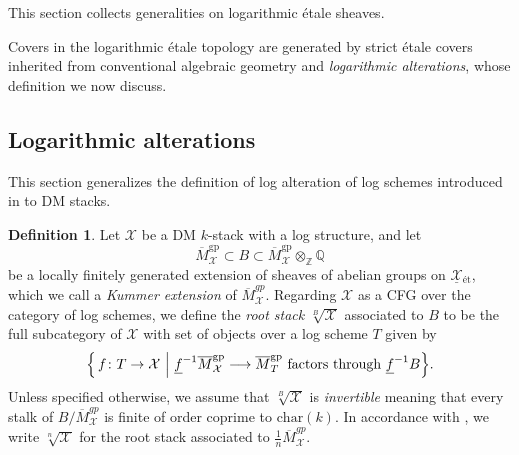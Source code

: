 \documentclass[11pt]{amsart}
\theoremstyle{definition}
\theoremstyle{definition}
\newtheorem{lemma}[theorem]{Lemma}
\newtheorem{definition}[theorem]{Definition}
\newcommand{\cX}{\mathcal{X}}
\newcommand{\ul}[1]{\underline{#1}}
\newcommand{\cal}{\mathcal}
\def\cX{{\cal X}}
\begin{document}
This section collects generalities on logarithmic \'etale sheaves. 

Covers in the logarithmic \'etale topology are generated by strict \'etale covers inherited from conventional algebraic geometry and \textit{logarithmic alterations}, whose definition we now discuss.

\subsection{Logarithmic alterations}\label{section: log alteration}
This section generalizes the definition of log alteration of log schemes introduced in \cite{MolchoWise,molcho2023remarks} to DM stacks. 
\begin{definition}\label{defn:RootStackKummerExt}
Let $\mathcal{X}$ be a DM $k$-stack with a log structure, and let
\[
\overline{M}_{\mathcal{X}}^{\mathrm{gp}} \subset B \subset \overline{M}_{\mathcal{X}}^{\mathrm{gp}} \otimes_{\mathbb{Z}} \mathbb{Q}
\]
be a locally finitely generated extension of sheaves of abelian groups on $\underline{\mathcal{X}}{}_{\text{\'et}}$, which we call a \emph{Kummer extension} of $\overline{M}_{\mathcal{X}}^{gp}$. Regarding $\cX$ as a CFG over the category of log schemes, we define the \textit{root stack} $\!\!\sqrt[B]{\mathcal{X}}$ associated to $B$ to be the full subcategory of $\cX$ with set of objects over a log scheme $T$ given by
$$
\Bigl\{
\, f \colon T \to \mathcal{X} \ \Big| \ 
\ul{f}^{-1}\overline{M}_{\mathcal{X}}^{\mathrm{gp}} \longrightarrow \overline{M}_T^{\mathrm{gp}}
\text{ factors through } \ul{f}^{-1}B 
\Bigr\}.
$$
Unless specified otherwise, we assume that $\!\!\sqrt[B]{\mathcal{X}}$ is \textit{invertible} meaning that every stalk of $B/\overline{M}_{\mathcal{X}}^{gp}$ is finite of order coprime to $\text{char}(k)$. In accordance with \cite{talpo2018infinite}, we write $\!\!\sqrt[n]{\cX}$ for the root stack associated to $\frac{1}{n}\overline{M}^{gp}_\cX$.
\end{definition}
\end{document}
